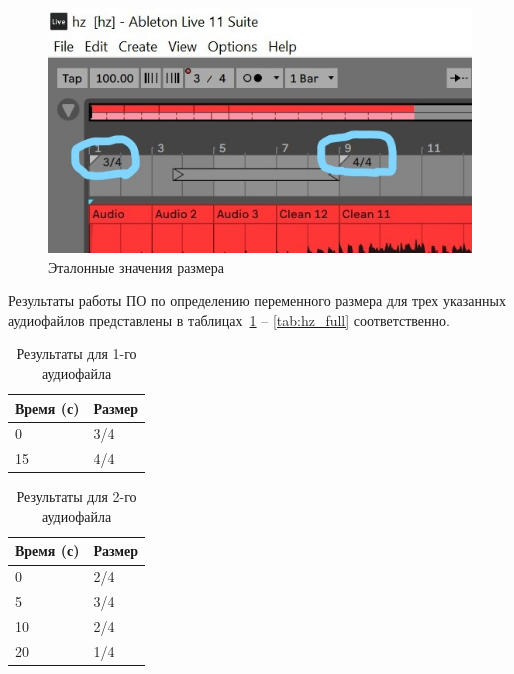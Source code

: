 \begin{figure}[h]
	\centering
	\includegraphics[scale=0.7]{inc/img/hz_ref.jpg}
	\caption{Эталонные значения размера}
	\label{img:hz_ref}
\end{figure}

\newpage

Результаты работы ПО по определению переменного размера для трех указанных аудиофайлов представлены в таблицах~\ref{tab:hz_drums} -- \ref{tab:hz_full} соответственно.

\begin{table}[!h]
	\begin{center}
		\caption{\label{tab:hz_drums}Результаты для 1-го аудиофайла}
		\begin{tabular}{|p{8cm}|p{8cm}|}
			\hline
			Время (с) & Размер\\
			\hline
			0 & 3/4\\
			\hline
			15 & 4/4\\
			\hline
		\end{tabular}
	\end{center}
\end{table}

\begin{table}[!h]
	\begin{center}
		\caption{\label{tab:hz_guitar}Результаты для 2-го аудиофайла}
		\begin{tabular}{|p{8cm}|p{8cm}|}
			\hline
			Время (с) & Размер\\
			\hline
			0 & 2/4\\
			\hline
			5 & 3/4\\
			\hline
			10 & 2/4\\
			\hline
			20 & 1/4\\
			\hline
		\end{tabular}
	\end{center}
\end{table}

